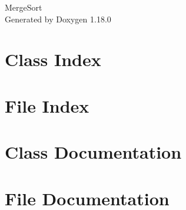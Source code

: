 \documentclass[twoside]{book}
\newcommand{\+}{\discretionary{\mbox{\scriptsize$\hookleftarrow$}}{}{}}
\newcommand{\clearemptydoublepage}{%
    \newpage{\pagestyle{empty}\cleardoublepage}%
  }
\begin{document}
  \raggedbottom
    \hypersetup{pageanchor=false,
                bookmarksnumbered=true,
                pdfencoding=unicode
               }
  \begin{titlepage}
  \vspace*{7cm}
  \begin{center}%
  {\Large Merge\+Sort}\\
  \vspace*{1cm}
  {\large Generated by Doxygen 1.18.0}\\
  \end{center}
  \end{titlepage}
  \clearemptydoublepage
  \tableofcontents
  \clearemptydoublepage
  \hypersetup{pageanchor=true}
\chapter{Class Index}

\chapter{File Index}

\chapter{Class Documentation}

\chapter{File Documentation}


  \backmatter
  \newpage
  \clearemptydoublepage
  \printindex
\end{document}
